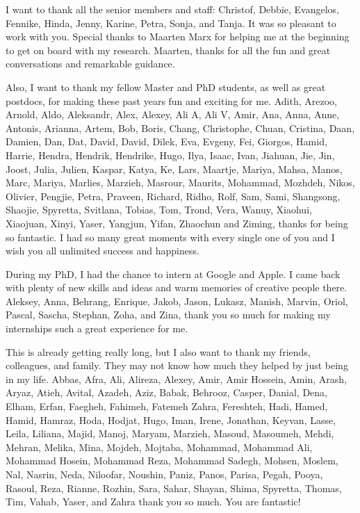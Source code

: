 I want to thank all the senior members and staff: Christof, Debbie, Evangelos, Fennike, Hinda, Jenny, Karine, Petra, Sonja, and Tanja. It was so pleasant to work with you.
Special thanks to Maarten Marx for helping me at the beginning to get on board with my research. Maarten, thanks for all the fun and great conversations and remarkable guidance.

Also, I want to thank my fellow Master and PhD students, as well as great postdocs, for making these past years fun and exciting for me. Adith, Arezoo, Arnold, Aldo, Aleksandr, Alex, Alexey, Ali A, Ali V, Amir, Ana, Anna, Anne, Antonis, Arianna, Artem, Bob, Boris, Chang, Christophe, Chuan, Cristina, Daan, Damien, Dan, Dat, David, David, Dilek, Eva, Evgeny, Fei, Giorgos, Hamid, Harrie, Hendra, Hendrik, Hendrike, Hugo, Ilya, Isaac, Ivan, Jiahuan, Jie, Jin, Joost, Julia, Julien, Kaspar, Katya, Ke, Lars, Maartje, Mariya, Mahsa, Manos, Marc, Mariya, Marlies, Marzieh, Masrour, Maurits, Mohammad, Mozhdeh, Nikos, Olivier, Pengjie, Petra, Praveen, Richard, Ridho, Rolf, Sam, Sami, Shangsong, Shaojie, Spyretta, Svitlana, Tobias, Tom, Trond, Vera, Wanuy, Xiaohui, Xiaojuan, Xinyi, Yaser, Yangjun, Yifan, Zhaochun and Ziming, thanks for being so fantastic.  I had so many great moments with every single one of you and I wish you all unlimited success and happiness.


During my PhD, I had the chance to intern at Google and Apple. I came back with plenty of new skills and ideas and warm memories of creative people there. Aleksey, Anna, Behrang, Enrique, Jakob, Jason, Lukasz, Manish, Marvin, Oriol, Pascal, Sascha, Stephan, Zoha, and Zina, thank you so much for making my internships such a great experience for me. 

This is already getting really long, but I also want to thank my friends, colleagues, and family. They may not know how much they helped by just being in my life. Abbas, Afra, Ali, Alireza, Alexey, Amir, Amir Hossein, Amin, Arash, Aryaz, Atieh, Avital, Azadeh, Aziz, Babak, Behrooz, Casper, Danial, Dena, Elham, Erfan, Faegheh, Fahimeh, Fatemeh Zahra, Fereshteh, Hadi, Hamed, Hamid, Hamraz, Hoda, Hodjat, Hugo, Iman, Irene, Jonathan, Keyvan, Lasse, Leila, Liliana, Majid, Manoj, Maryam, Marzieh, Masoud, Masoumeh, Mehdi, Mehran, Melika, Mina, Mojdeh, Mojtaba, Mohammad, Mohammad Ali, Mohammad Hosein, Mohammad Reza, Mohammad Sadegh, Mohsen, Moslem, Nal, Nasrin, Neda, Niloofar, Noushin, Paniz, Panos, Parisa, Pegah, Pooya, Rasoul, Reza, Rianne, Rozhin, Sara, Sahar, Shayan, Shima, Spyretta, Thomas, Tim, Vahab, Yaser, and Zahra thank you so much. You are fantastic!

